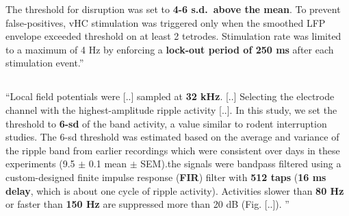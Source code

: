 The threshold for disruption was set to \textbf{4-6 s.d.\ above the mean}. To prevent false-positives, vHC stimulation was triggered only when the smoothed LFP envelope exceeded threshold on at least 2 tetrodes. Stimulation rate was limited to a maximum of 4 Hz by enforcing a \textbf{lock-out period of 250 ms} after each stimulation event.'' \cite{Jadhav2012}


\subsection{}

``Local field potentials were [..] sampled at \textbf{32 kHz}. [..] Selecting the electrode channel with the highest-amplitude ripple activity [..].  In this study, we set the threshold to \textbf{6-sd} of the band activity, a value similar to rodent interruption studies. The 6-sd threshold was estimated based on the average and variance of the ripple band from earlier recordings which were consistent over days in these experiments (9.5 $\pm$ 0.1 \uV{} mean $\pm$ SEM).\newline
[..] the signals were bandpass filtered using a custom-designed finite impulse response (\textbf{FIR}) filter with \textbf{512 taps} (\textbf{16 ms delay}, which is about one cycle of ripple activity).\footnotemark{} Activities slower than \textbf{80 Hz} or faster than \textbf{150 Hz} are suppressed more than 20 dB (Fig. [..]). '' \cite{Talakoub2016}



\subsection{}

